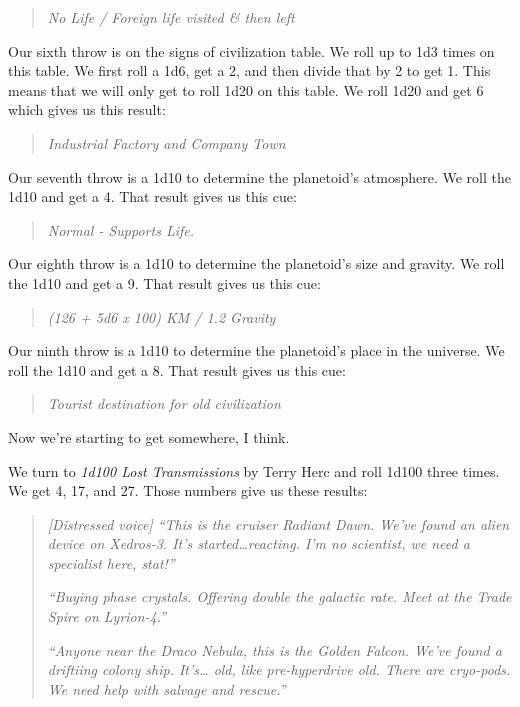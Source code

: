 \begin{quote}
\emph{No Life / Foreign life visited \& then left}
\end{quote}

Our sixth throw is on the signs of civilization table. We roll up to 1d3
times on this table. We first roll a 1d6, get a 2, and then divide that
by 2 to get 1. This means that we will only get to roll 1d20 on this
table. We roll 1d20 and get 6 which gives us this result:

\begin{quote}
\emph{Industrial Factory and Company Town}
\end{quote}

Our seventh throw is a 1d10 to determine the planetoid's atmosphere. We
roll the 1d10 and get a 4. That result gives us this cue:

\begin{quote}
\emph{Normal - Supports Life.}
\end{quote}

Our eighth throw is a 1d10 to determine the planetoid's size and
gravity. We roll the 1d10 and get a 9. That result gives us this cue:

\begin{quote}
\emph{(126 + 5d6 x 100) KM / 1.2 Gravity}
\end{quote}

Our ninth throw is a 1d10 to determine the planetoid's place in the
universe. We roll the 1d10 and get a 8. That result gives us this cue:

\begin{quote}
\emph{Tourist destination for old civilization}
\end{quote}

Now we're starting to get somewhere, I think.

We turn to \emph{1d100 Lost Transmissions} by Terry Herc and roll 1d100
three times. We get 4, 17, and 27. Those numbers give us these results:

\begin{quote}
\emph{{[}Distressed voice{]} ``This is the cruiser Radiant Dawn. We've
found an alien device on Xedros-3. It's started\ldots reacting. I'm no
scientist, we need a specialist here, stat!''}

\emph{``Buying phase crystals. Offering double the galactic rate. Meet
at the Trade Spire on Lyrion-4.''}

\emph{``Anyone near the Draco Nebula, this is the Golden Falcon. We've
found a driftiing colony ship. It's\ldots{} old, like pre-hyperdrive
old. There are cryo-pods. We need help with salvage and rescue.''}
\end{quote}

